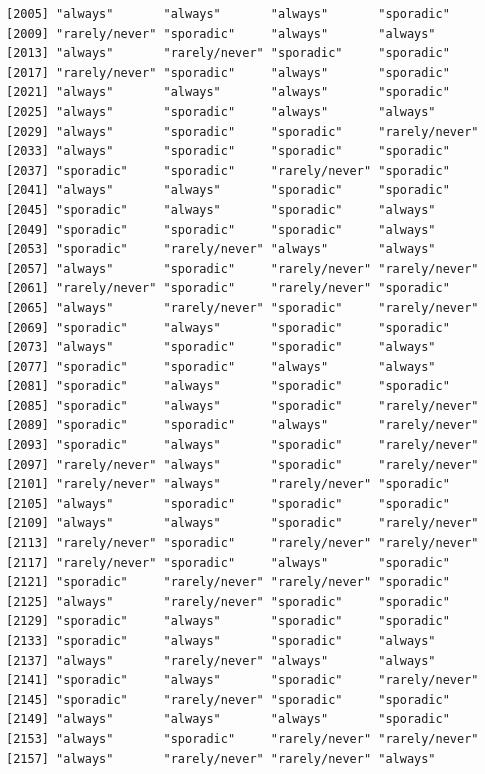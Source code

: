 \documentclass[
  letterpaper,
  DIV=11,
  numbers=noendperiod]{scrartcl}
\begin{document}
\begin{verbatim}
[2005] "always"       "always"       "always"       "sporadic"    
[2009] "rarely/never" "sporadic"     "always"       "always"      
[2013] "always"       "rarely/never" "sporadic"     "sporadic"    
[2017] "rarely/never" "sporadic"     "always"       "sporadic"    
[2021] "always"       "always"       "always"       "sporadic"    
[2025] "always"       "sporadic"     "always"       "always"      
[2029] "always"       "sporadic"     "sporadic"     "rarely/never"
[2033] "always"       "sporadic"     "sporadic"     "sporadic"    
[2037] "sporadic"     "sporadic"     "rarely/never" "sporadic"    
[2041] "always"       "always"       "sporadic"     "sporadic"    
[2045] "sporadic"     "always"       "sporadic"     "always"      
[2049] "sporadic"     "sporadic"     "sporadic"     "always"      
[2053] "sporadic"     "rarely/never" "always"       "always"      
[2057] "always"       "sporadic"     "rarely/never" "rarely/never"
[2061] "rarely/never" "sporadic"     "rarely/never" "sporadic"    
[2065] "always"       "rarely/never" "sporadic"     "rarely/never"
[2069] "sporadic"     "always"       "sporadic"     "sporadic"    
[2073] "always"       "sporadic"     "sporadic"     "always"      
[2077] "sporadic"     "sporadic"     "always"       "always"      
[2081] "sporadic"     "always"       "sporadic"     "sporadic"    
[2085] "sporadic"     "always"       "sporadic"     "rarely/never"
[2089] "sporadic"     "sporadic"     "always"       "rarely/never"
[2093] "sporadic"     "always"       "sporadic"     "rarely/never"
[2097] "rarely/never" "always"       "sporadic"     "rarely/never"
[2101] "rarely/never" "always"       "rarely/never" "sporadic"    
[2105] "always"       "sporadic"     "sporadic"     "sporadic"    
[2109] "always"       "always"       "sporadic"     "rarely/never"
[2113] "rarely/never" "sporadic"     "rarely/never" "rarely/never"
[2117] "rarely/never" "sporadic"     "always"       "sporadic"    
[2121] "sporadic"     "rarely/never" "rarely/never" "sporadic"    
[2125] "always"       "rarely/never" "sporadic"     "sporadic"    
[2129] "sporadic"     "always"       "sporadic"     "sporadic"    
[2133] "sporadic"     "always"       "sporadic"     "always"      
[2137] "always"       "rarely/never" "always"       "always"      
[2141] "sporadic"     "always"       "sporadic"     "rarely/never"
[2145] "sporadic"     "rarely/never" "sporadic"     "sporadic"    
[2149] "always"       "always"       "always"       "sporadic"    
[2153] "always"       "sporadic"     "rarely/never" "rarely/never"
[2157] "always"       "rarely/never" "rarely/never" "always"      

\end{verbatim}
\end{document}
